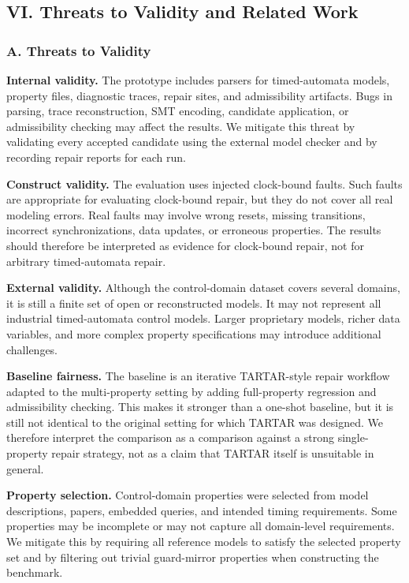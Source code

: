 \documentclass[
]{article}
\begin{document}
\subsection{VI. Threats to Validity and Related
Work}\label{vi.-threats-to-validity-and-related-work}

\subsubsection{A. Threats to Validity}\label{a.-threats-to-validity}

\textbf{Internal validity.} The prototype includes parsers for
timed-automata models, property files, diagnostic traces, repair sites,
and admissibility artifacts. Bugs in parsing, trace reconstruction, SMT
encoding, candidate application, or admissibility checking may affect
the results. We mitigate this threat by validating every accepted
candidate using the external model checker and by recording repair
reports for each run.

\textbf{Construct validity.} The evaluation uses injected clock-bound
faults. Such faults are appropriate for evaluating clock-bound repair,
but they do not cover all real modeling errors. Real faults may involve
wrong resets, missing transitions, incorrect synchronizations, data
updates, or erroneous properties. The results should therefore be
interpreted as evidence for clock-bound repair, not for arbitrary
timed-automata repair.

\textbf{External validity.} Although the control-domain dataset covers
several domains, it is still a finite set of open or reconstructed
models. It may not represent all industrial timed-automata control
models. Larger proprietary models, richer data variables, and more
complex property specifications may introduce additional challenges.

\textbf{Baseline fairness.} The baseline is an iterative TARTAR-style
repair workflow adapted to the multi-property setting by adding
full-property regression and admissibility checking. This makes it
stronger than a one-shot baseline, but it is still not identical to the
original setting for which TARTAR was designed. We therefore interpret
the comparison as a comparison against a strong single-property repair
strategy, not as a claim that TARTAR itself is unsuitable in general.

\textbf{Property selection.} Control-domain properties were selected
from model descriptions, papers, embedded queries, and intended timing
requirements. Some properties may be incomplete or may not capture all
domain-level requirements. We mitigate this by requiring all reference
models to satisfy the selected property set and by filtering out trivial
guard-mirror properties when constructing the benchmark.
\end{document}
